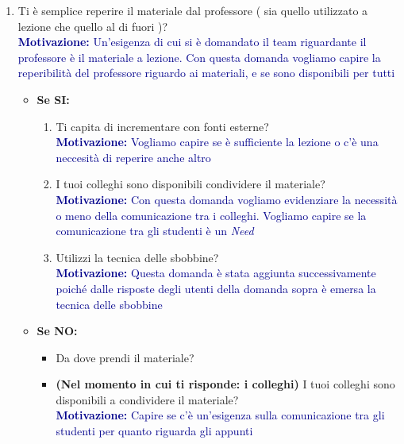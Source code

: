 \begin{enumerate}
    \item Ti è semplice reperire il materiale dal professore ( sia quello utilizzato a lezione che quello al di fuori )?\\
    \textcolor{darkblue}{\textbf{Motivazione:} Un'esigenza di cui si è domandato il team riguardante il professore è il materiale a lezione.
    Con questa domanda vogliamo capire la reperibilità del professore riguardo ai materiali, e se sono disponibili per tutti}
    \begin{itemize}
        \item \textbf{Se SI:}
        \begin{enumerate}
            \item Ti capita di incrementare con fonti esterne?\\
            \textcolor{darkblue}{\textbf{Motivazione:} Vogliamo capire se è sufficiente la lezione o c'è una neccesità di reperire anche altro}
            \item I tuoi colleghi sono disponibili condividere il materiale?\\
            \textcolor{darkblue}{\textbf{Motivazione:} Con questa domanda vogliamo evidenziare la necessità o meno della comunicazione tra i colleghi. 
            Vogliamo capire se la comunicazione tra gli studenti è un \textit{Need}}
            \item Utilizzi la tecnica delle sbobbine?\\
            \textcolor{darkblue}{\textbf{Motivazione:} Questa domanda è stata aggiunta successivamente poiché dalle risposte degli utenti della domanda sopra è emersa
            la tecnica delle sbobbine}
        \end{enumerate}

        \item \textbf{Se NO:}
        \begin{itemize}
            \item Da dove prendi il materiale?
            \item \textbf{(Nel momento in cui ti risponde: i colleghi)} I tuoi colleghi sono disponibili a condividere il materiale?\\
            \textcolor{darkblue}{\textbf{Motivazione:} Capire se c'è un'esigenza sulla comunicazione tra gli studenti per quanto riguarda gli appunti}
        \end{itemize}
    \end{itemize}
\end{enumerate}

